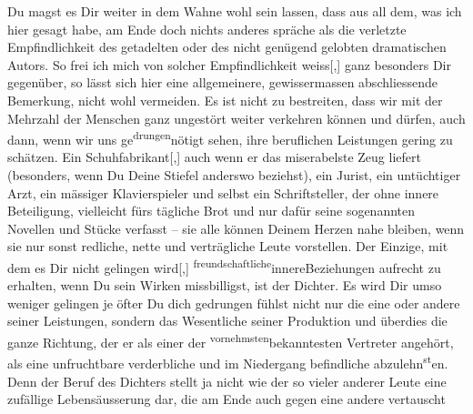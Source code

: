 \pstart
           Du magst es Dir weiter in dem Wahne wohl sein lassen, dass aus all dem, was ich hier
               gesagt habe, am Ende doch nichts anderes spräche als die verletzte Empfindlichkeit
               des getadelten oder des nicht genügend gelobten dramatischen Autors. So frei ich mich
               von solcher Empfindlichkeit weiss{[},{]} ganz besonders Dir gegenüber,
               so lässt sich hier eine \introOben{}allgemeinere\introOben{}, gewissermassen
               abschliessende Bemerkung, nicht wohl vermeiden. Es ist nicht zu bestreiten, dass wir
               mit der Mehrzahl der Menschen ganz ungestört weiter verkehren können und dürfen, auch
               dann, wenn wir uns ge\substVorne{}\textsuperscript{drungen}{\allowbreak}\substDazwischen{}nötigt\substHinten{} sehen, ihre beruflichen Leistungen gering zu schätzen. Ein
                  Schuhfabrikant{[},{]} auch wenn er das miserabelste Zeug liefert
               (besonders, wenn Du Deine Stiefel anderswo beziehst), ein \label{T_L03521-3v}\label{T_L03521-3h} Jurist, ein untüchtiger Arzt,
               ein mässiger Klavierspieler und selbst ein Schriftsteller, der ohne innere
               Beteiligung, vielleicht fürs tägliche Brot und nur dafür seine sogenannten Novellen
               und Stücke verfasst – sie alle können Deinem Herzen nahe bleiben, wenn sie nur sonst
               redliche, nette und verträgliche Leute vorstellen. Der Einzige, mit dem es Dir nicht
               gelingen wird{[},{]}{ }\substVorne{}\textsuperscript{freundschaftliche}{\allowbreak}\substDazwischen{}innere\substHinten{}{ }{\pb}Beziehungen aufrecht zu erhalten,
               wenn Du sein Wirken missbilligst, ist der Dichter. Es wird Dir umso weniger gelingen
               je öfter Du \introOben{}dich gedrungen fühlst\introOben{} nicht nur die eine oder
               andere seiner Leistungen, sondern das Wesentliche seiner Produktion und überdies die
               ganze Richtung, der er als einer der \substVorne{}\textsuperscript{vornehmsten}{\allowbreak}\substDazwischen{}bekanntesten\substHinten{} Vertreter angehört, als eine unfruchtbare verderbliche und im Niedergang
               befindliche ab\introOben{}zu\introOben{}lehn\substVorne{}\textsuperscript{st}\substDazwischen{}en\substHinten{}. Denn der Beruf des Dichters stellt ja nicht wie der so vieler anderer Leute
               eine zufällige Lebensäusserung dar, die am Ende auch gegen eine andere vertauscht
